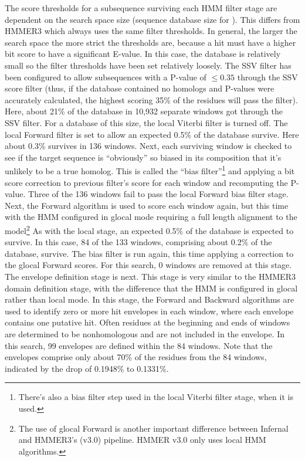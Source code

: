 The score thresholds for a subsequence surviving each HMM filter stage
are dependent on the search space size (sequence database size for
). This differs from HMMER3 which always uses the same
filter thresholds. In general, the larger the search
space the more strict the thresholds are, because a hit must have a
higher bit score to have a significant E-value.  In this case, the
database is relatively small so the filter thresholds have been set
relatively loosely. The SSV filter has been configured to allow
subsequences with a P-value of $\leq 0.35$ through
the SSV score filter (thus, if the database contained no homologs and
P-values were accurately calculated, the highest scoring 35\% of the
residues will pass the filter). Here, about 21\% of the database in
10,932 separate windows got through the SSV filter. For a database of
this size, the local Viterbi filter is turned off.  The local Forward filter
is set to allow an expected 0.5\% of the database survive. Here about
0.3\% survives in 136 windows. Next, each surviving window is checked
to see if the target sequence is ``obviously'' so biased in its
composition that it's unlikely to be a true homolog. This is called
the ``bias filter''\footnote{There's also a bias filter step used in
  the local Viterbi filter stage, when it is used.} and applying a bit
score correction to previous filter's score for each window and
recomputing the P-value. Three of the 136 windows fail to pass
the local Forward bias filter stage. Next, the Forward algorithm is
used to score each window again, but this time with the HMM configured
in glocal mode requiring a full length alignment to the
model\footnote{The use of glocal Forward is another important
  difference between Infernal and HMMER3's (v3.0) pipeline. HMMER v3.0
  only uses local HMM algorithms.}  As with the local stage, an
expected 0.5\% of the database is expected to survive. In this case,
84 of the 133 windows, comprising about 0.2\% of the database,
survive. The bias filter is run again, this time applying a correction
to the glocal Forward scores. For this search, 0 windows are removed at
this stage. The envelope definition stage is next. This stage is very
similar to the HMMER3 domain definition stage, with the difference
that the HMM is configured in glocal rather than local mode. In this
stage, the Forward and Backward algorithms are used to identify zero
or more hit envelopes in each window, where each envelope contains one
putative hit.  Often residues at the beginning and ends of windows are
determined to be nonhomologous and are not included in the
envelope. In this search,  99 envelopes are defined within the 84
windows. Note that the envelopes comprise only about 70\% of the
residues from the 84 windows, indicated by the drop of 0.1948\% to
0.1331\%.

